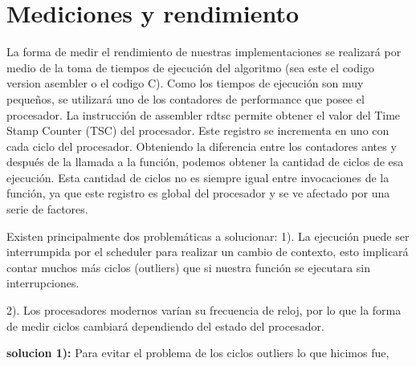 \section{Mediciones y rendimiento}

La forma de medir el rendimiento de nuestras implementaciones se realizará por medio de la toma de tiempos de ejecución del algoritmo (sea este el codigo version asembler o el codigo C). Como los tiempos de ejecución son muy pequeños, se utilizará uno de los contadores de performance que posee el procesador.
La instrucción de assembler rdtsc permite obtener el valor del Time Stamp Counter (TSC) del procesador. Este registro se incrementa en uno con cada ciclo del procesador. Obteniendo la diferencia entre los contadores antes y después de la llamada a la función, podemos obtener la cantidad de ciclos de esa ejecución. Esta cantidad de ciclos no es siempre igual entre invocaciones de la función, ya que este registro es global del procesador y se ve afectado por una serie de factores. \newline

Existen principalmente dos problemáticas a solucionar:
1). La ejecución puede ser interrumpida por el scheduler para realizar un cambio de contexto,
esto implicará contar muchos más ciclos (outliers) que si nuestra función se ejecutara sin
interrupciones.

2). Los procesadores modernos varían su frecuencia de reloj, por lo que la forma de medir
ciclos cambiará dependiendo del estado del procesador.
\newline

\textbf{solucion 1):} Para evitar el problema de los ciclos outliers lo que hicimos fue,

